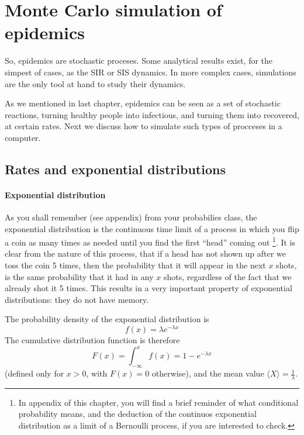 \chapter{Monte Carlo simulation of epidemics}

So, epidemics are stochastic proceses. Some analytical results exist, for the simpest of cases, as the SIR or SIS dynamics. In more complex cases, simulations are the only tool at hand to study their dynamics.

As we mentioned in last chapter, epidemics can be seen as a set of stochastic reactions, turning healthy people into infectious, and turning them into recovered, at certain rates. Next we discuss how to simulate such types of procceses in a computer.

%  

\section{Rates and exponential distributions}

\subsubsection*{Exponential distribution}

As you shall remember (see appendix) from your probabilies class, the exponential distribution is the continuous time limit of a process in which you flip a coin as many times as needed until you find the first ``head'' coming out \footnote{In appendix of this chapter, you will find a brief reminder of what conditional probability means, and the deduction of the continuos exponential distribution as a limit of a Bernoulli process, if you are interested to check.}. It is clear from the nature of this process, that if a head has not shown up after we toss the coin 5 times, then the probability that it will appear in the next $x$ shots, is the same probability that it had in any $x$ shots, regardless of the fact that we already shot it 5 times. This results in a very important property of exponential distributions: they do not have memory.

The probability density of the exponential distribution is
\[ f(x) = {\lambda} e^{- \lambda x}
\]
The cumulative distribution function is therefore
\[ F(x) =  \int_{-\infty}^x  f(x) = 1-e^{- \lambda  x} \] (defined only for $x>0$, with $F(x)=0$ otherwise), and the mean value $\langle X \rangle = \frac 1 \lambda $.



